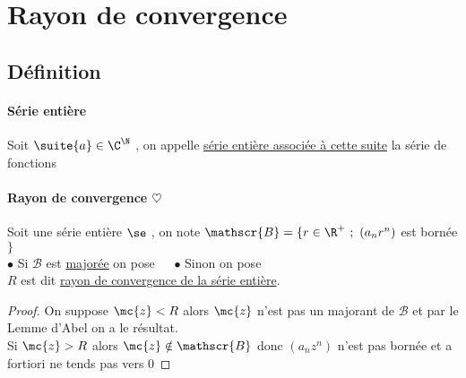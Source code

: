 

\minitoc
	\section{Rayon de convergence}
	\subsection{Définition}
		\traitd
		\paragraph{Série entière}
			Soit $\suite{a}\in\C^\N$ , on appelle \uline{série entière associée à cette suite} la série de fonctions \begin{center}
			\end{center}
		\trait
		\traitd
		\paragraph{Rayon de convergence $\heartsuit$} ${}$ \\
			Soit une série entière $\se$ , on note $\mathscr{B}=\{r\in\R^+ ~;~ (a_nr^n)$ est bornée $\}$\\
			$\bullet $ Si $\mathscr{B}$ est \uline{majorée} on pose  $~~~~$ 
			$\bullet$ Sinon on pose \\
			$R$ est dit \uline{rayon de convergence de la série entière}.\trait
		\begin{proof}
		On suppose $\mc{z} < R$ alors $\mc{z}$ n'est pas un majorant de $\mathscr{B}$ et par le Lemme d'Abel on a le résultat.\\
		Si $\mc{z} > R$ alors $\mc{z} \notin \mathscr{B}$ donc $(a_nz^n)$ n'est pas bornée et a fortiori ne tends pas vers $0$
		\end{proof} ${}$
